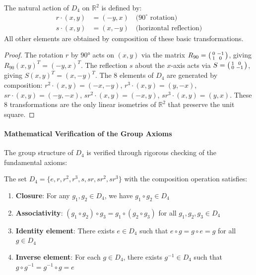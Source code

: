 \begin{proposition}
The natural action of $D_4$ on $\mathbb{R}^2$ is defined by:
\begin{align}
r \cdot (x,y) &= (-y, x) \quad \text{($90^\circ$ rotation)} \\
s \cdot (x,y) &= (x, -y) \quad \text{(horizontal reflection)}
\end{align}
All other elements are obtained by composition of these basic transformations.
\end{proposition}

\begin{proof}
The rotation $r$ by $90°$ acts on $(x,y)$ via the matrix $R_{90} = \begin{psmallmatrix} 0 & -1 \\ 1 & 0 \end{psmallmatrix}$, giving $R_{90}(x,y)^T = (-y,x)^T$. The reflection $s$ about the $x$-axis acts via $S = \begin{psmallmatrix} 1 & 0 \\ 0 & -1 \end{psmallmatrix}$, giving $S(x,y)^T = (x,-y)^T$. The 8 elements of $D_4$ are generated by composition: $r^2 \cdot (x,y) = (-x,-y)$, $r^3 \cdot (x,y) = (y,-x)$, $sr \cdot (x,y) = (-y,-x)$, $sr^2 \cdot (x,y) = (-x,y)$, $sr^3 \cdot (x,y) = (y,x)$. These 8 transformations are the only linear isometries of $\mathbb{R}^2$ that preserve the unit square.
\end{proof}

\paragraph{Mathematical Verification of the Group Axioms}

The group structure of $D_4$ is verified through rigorous checking of the fundamental axioms:

\begin{theorem}[Axioms of $D_4$]
The set $D_4 = \{e, r, r^2, r^3, s, sr, sr^2, sr^3\}$ with the composition operation satisfies:

\begin{enumerate}
    \item \textbf{Closure}: For any $g_1, g_2 \in D_4$, we have $g_1 \circ g_2 \in D_4$
    \item \textbf{Associativity}: $(g_1 \circ g_2) \circ g_3 = g_1 \circ (g_2 \circ g_3)$ for all $g_1, g_2, g_3 \in D_4$
    \item \textbf{Identity element}: There exists $e \in D_4$ such that $e \circ g = g \circ e = g$ for all $g \in D_4$
    \item \textbf{Inverse element}: For each $g \in D_4$, there exists $g^{-1} \in D_4$ such that $g \circ g^{-1} = g^{-1} \circ g = e$
\end{enumerate}
\end{theorem}


